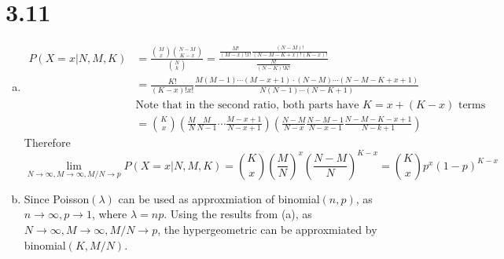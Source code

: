 \documentclass[letterpaper]{article}
\begin{document}
    \section*{3.11}
    \begin{enumerate}[(a)]
    \item 
    \begin{align*}
    P(X=x|N,M,K) & = \frac{\binom{M}{x} \binom{N-M}{K-x}}{\binom{N}{k}} 
    = \frac{\frac{M!}{(M-x)!x!} \frac{(N-M)!}{(N-M-K+x)!(K-x)!}}{\frac{N!}{(N-K)!K!}} \\
    & = \frac{K!}{(K-x)!x!} \frac{M(M-1)\cdots(M-x+1) \cdot (N-M) \cdots (N-M-K+x+1)}{N(N-1)\cdots(N-K+1)}\\
    & \text{Note that in the second ratio, both parts have $K = x + (K-x)$ terms}\\
    & = \binom{K}{x} \left(\frac{M}{N} \frac{M}{N-1} \cdots \frac{M-x+1}{N-x+1} \right) \left(\frac{N-M}{N-x} \frac{N-M-1}{N-x-1} \frac{N-M-K-x+1}{N-k+1} \right)
    \end{align*}
    Therefore
    \[
    \lim_{N \to \infty, M \to \infty, M/N \to p} P(X=x|N,M,K) = \binom{K}{x} \left(\frac{M}{N}\right)^x \left(\frac{N-M}{N}\right)^{K-x} = \binom{K}{x} p^x (1-p)^{K-x}
    \]

    \item Since Poisson$(\lambda)$ can be used as approxmiation of binomial$(n, p)$, as $n \to \infty, p \to 1$, where $\lambda = np$. Using the results from (a), as $N\to\infty, M\to\infty, M/N\to p$, 
    the hypergeometric can be approxmiated by binomial$(K, M/N)$.


\end{enumerate}
\end{document}
